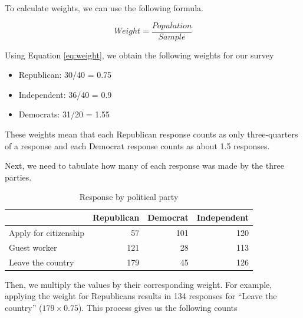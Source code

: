 \documentclass[
]{book}
\providecommand{\tightlist}{%
  \setlength{\itemsep}{0pt}\setlength{\parskip}{0pt}}
\begin{document}
To calculate weights, we can use the following formula.

\begin{equation}
Weight = \frac{Population}{Sample}
\label{eq:weight}
\end{equation}

Using Equation \eqref{eq:weight}, we obtain the following weights for our survey

\begin{itemize}
\tightlist
\item
  Republican: 30/40 = 0.75
\item
  Independent: 36/40 = 0.9
\item
  Democrats: 31/20 = 1.55
\end{itemize}

These weights mean that each Republican response counts as only three-quarters of a response and each Democrat response counts as about 1.5 responses.

Next, we need to tabulate how many of each response was made by the three parties.

\begin{table}

\caption{\label{tab:unnamed-chunk-267}Response by political party}
\centering
\begin{tabular}[t]{l|r|r|r}
\hline
  & Republican & Democrat & Independent\\
\hline
Apply for citizenship & 57 & 101 & 120\\
\hline
Guest worker & 121 & 28 & 113\\
\hline
Leave the country & 179 & 45 & 126\\
\hline
\end{tabular}
\end{table}

Then, we multiply the values by their corresponding weight. For example, applying the weight for Republicans results in 134 responses for ``Leave the country'' (\(179 \times 0.75\)). This process gives us the following counts
\end{document}

